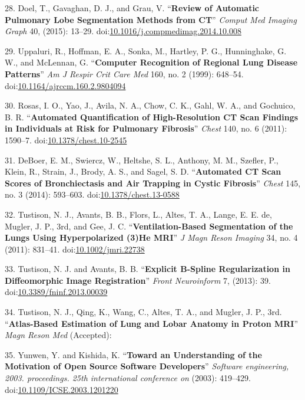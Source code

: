 \documentclass[11pt,]{article}
\begin{document}
28. Doel, T., Gavaghan, D. J., and Grau, V. ``\textbf{Review of
Automatic Pulmonary Lobe Segmentation Methods from CT}'' \emph{Comput
Med Imaging Graph} 40, (2015): 13--29.
doi:\href{http://dx.doi.org/10.1016/j.compmedimag.2014.10.008}{10.1016/j.compmedimag.2014.10.008}

29. Uppaluri, R., Hoffman, E. A., Sonka, M., Hartley, P. G.,
Hunninghake, G. W., and McLennan, G. ``\textbf{Computer Recognition of
Regional Lung Disease Patterns}'' \emph{Am J Respir Crit Care Med} 160,
no. 2 (1999): 648--54.
doi:\href{http://dx.doi.org/10.1164/ajrccm.160.2.9804094}{10.1164/ajrccm.160.2.9804094}

30. Rosas, I. O., Yao, J., Avila, N. A., Chow, C. K., Gahl, W. A., and
Gochuico, B. R. ``\textbf{Automated Quantification of High-Resolution CT
Scan Findings in Individuals at Risk for Pulmonary Fibrosis}''
\emph{Chest} 140, no. 6 (2011): 1590--7.
doi:\href{http://dx.doi.org/10.1378/chest.10-2545}{10.1378/chest.10-2545}

31. DeBoer, E. M., Swiercz, W., Heltshe, S. L., Anthony, M. M., Szefler,
P., Klein, R., Strain, J., Brody, A. S., and Sagel, S. D.
``\textbf{Automated CT Scan Scores of Bronchiectasis and Air Trapping in
Cystic Fibrosis}'' \emph{Chest} 145, no. 3 (2014): 593--603.
doi:\href{http://dx.doi.org/10.1378/chest.13-0588}{10.1378/chest.13-0588}

32. Tustison, N. J., Avants, B. B., Flors, L., Altes, T. A., Lange, E.
E. de, Mugler, J. P., 3rd, and Gee, J. C. ``\textbf{Ventilation-Based
Segmentation of the Lungs Using Hyperpolarized (3)He MRI}'' \emph{J Magn
Reson Imaging} 34, no. 4 (2011): 831--41.
doi:\href{http://dx.doi.org/10.1002/jmri.22738}{10.1002/jmri.22738}

33. Tustison, N. J. and Avants, B. B. ``\textbf{Explicit B-Spline
Regularization in Diffeomorphic Image Registration}'' \emph{Front
Neuroinform} 7, (2013): 39.
doi:\href{http://dx.doi.org/10.3389/fninf.2013.00039}{10.3389/fninf.2013.00039}

34. Tustison, N. J., Qing, K., Wang, C., Altes, T. A., and Mugler, J.
P., 3rd. ``\textbf{Atlas-Based Estimation of Lung and Lobar Anatomy in
Proton MRI}'' \emph{Magn Reson Med} (Accepted):

35. Yunwen, Y. and Kishida, K. ``\textbf{Toward an Understanding of the
Motivation of Open Source Software Developers}'' \emph{Software
engineering, 2003. proceedings. 25th international conference on}
(2003): 419--429.
doi:\href{http://dx.doi.org/10.1109/ICSE.2003.1201220}{10.1109/ICSE.2003.1201220}
\end{document}
